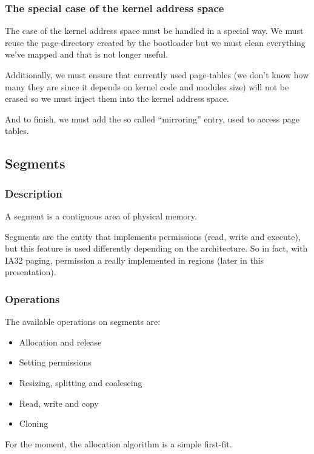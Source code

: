 
\begin{frame}
  \frametitle{The special case of the kernel address space}

  The case  of the kernel address  space must be handled  in a special
  way. We must reuse the  page-directory created by the bootloader but
  we must clean everything we've mapped and that is not longer useful.

  \nl

  Additionally,  we must  ensure that  currently used  page-tables (we
  don't know  how many they  are since it  depends on kernel  code and
  modules size)  will not be  erased so we  must inject them  into the
  kernel address space.

  \nl

  And to finish,  we must add the so  called ``mirroring'' entry, used
  to access page tables.

\end{frame}

%
%

\subsection{Segments}


\begin{frame}
  \frametitle{Description}

  A segment is a contiguous area of physical memory.

  \nl

  Segments are the entity that implements permissions (read, write and
  execute),  but this  feature is  used differently  depending  on the
  architecture.  So in  fact, with  IA32 paging,  permission  a really
  implemented in regions (later in this presentation).

\end{frame}


\begin{frame}
  \frametitle{Operations}

  The available operations on segments are:

  \begin{itemize}
  \item Allocation and release
  \item Setting permissions
  \item Resizing, splitting and coalescing
  \item Read, write and copy
  \item Cloning
  \end{itemize}

  \nl

  For the moment, the allocation algorithm is a simple first-fit.

\end{frame}

